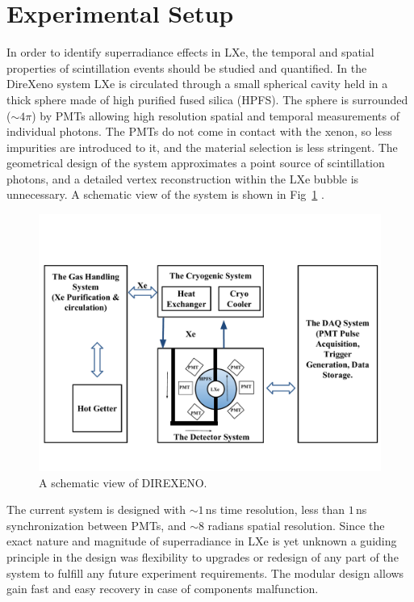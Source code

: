 \section{Experimental Setup}
\label{expSetup}


In order to identify superradiance effects in LXe, the temporal and spatial properties of scintillation events should be studied and quantified. In the DireXeno system LXe is circulated through a small spherical cavity held in a thick sphere made of high purified fused silica (HPFS). The sphere is surrounded ($\sim4\pi$) by PMTs allowing high resolution spatial and temporal measurements of individual photons. The PMTs do not come in contact with the xenon, so less impurities are introduced to it, and the material selection is less stringent. The geometrical design of the system approximates a point  source of scintillation photons, and a detailed vertex reconstruction within the LXe bubble is unnecessary. A schematic view of the system is shown in Fig~\ref{fig:detSch} . 

\begin{figure}[h]
\centerline{\includegraphics[width=0.8\linewidth]{DetSch.pdf}}
\caption{A schematic view of DIREXENO.}
\label{fig:detSch}
\end{figure}


The current system is designed with  $\sim1$\,ns time resolution, less than $1$\,ns synchronization between PMTs, and $\sim8$ radians spatial resolution. Since the exact nature and magnitude of superradiance in LXe is yet unknown a guiding principle in the design was flexibility to upgrades or redesign of any part of the system to fulfill any future experiment requirements. The modular design allows gain fast and easy recovery in case of components malfunction.

